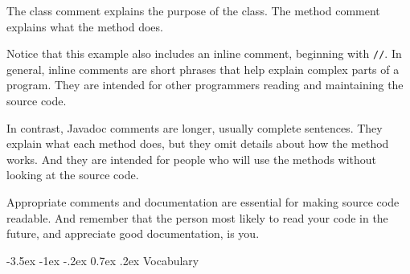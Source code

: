 \documentclass[12pt]{book}
\makeatletter
\theoremstyle{exercise}
\newcommand{\java}[1]{\verb"#1"}
\renewcommand{\section}{\@startsection{section}{1}{\z@}%
    {-3.5ex \@plus -1ex \@minus -.2ex}%
    {0.7ex \@plus.2ex}%
    {\normalfont\Large\bfseries}}
\newcommand{\java}[1]{\lstinline{#1}} %
\makeatother
\begin{document}
The class comment explains the purpose of the class.
The method comment explains what the method does.

Notice that this example also includes an inline comment, beginning with \java{//}.
In general, inline comments are short phrases that help explain complex parts of a program.
They are intended for other programmers reading and maintaining the source code.

In contrast, Javadoc comments are longer, usually complete sentences.
They explain what each method does, but they omit details about how the method works.
And they are intended for people who will use the methods without looking at the source code.

Appropriate comments and documentation are essential for making source code readable.
And remember that the person most likely to read your code in the future, and appreciate good documentation, is you.


\section{Vocabulary}
\end{document}
